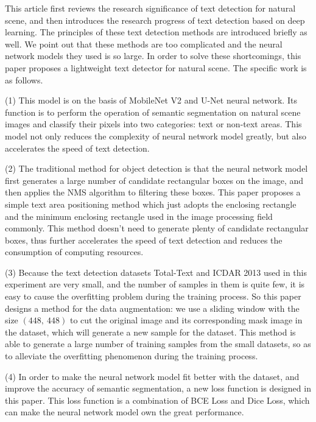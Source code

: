 \documentclass[22pt, UTF8]{article}
\numberwithin{figure}{section}
\numberwithin{table}{section}
\numberwithin{equation}{section} %
\begin{document}
\setlength\parindent{2em} This article first reviews the research significance of text detection for natural scene, and then introduces the research progress of text detection based on deep learning. The principles of these text detection methods are introduced briefly as well. We point out that these methods are too complicated and the neural network models they used is so large. In order to solve these shortcomings, this paper proposes a lightweight text detector for natural scene. The specific work is as follows.

\setlength\parindent{2em} (1) This model is on the basis of MobileNet V2 and U-Net neural network. Its function is to perform the operation of semantic segmentation on natural scene images and classify their pixels into two categories: text or non-text areas. This model not only reduces the complexity of neural network model greatly, but also accelerates the speed of text detection.

\setlength\parindent{2em} (2) The traditional method for object detection is that the neural network model first generates a large number of candidate rectangular boxes on the image, and then applies the NMS algorithm to filtering these boxes. This paper proposes a simple text area positioning method which just adopts the enclosing rectangle and the minimum enclosing rectangle used in the image processing field commonly. This method doesn't need to generate plenty of candidate rectangular boxes, thus further accelerates the speed of text detection and reduces the consumption of computing resources.

\setlength\parindent{2em} (3) Because the text detection datasets Total-Text and ICDAR 2013 used in this experiment are very small, and the number of samples in them is quite few, it is easy to cause the overfitting problem during the training process. So this paper designs a method for the data augmentation: we use a sliding window with the size $(448,\ 448)$ to cut the original image and its corresponding mask image in the dataset, which will generate a new sample for the dataset. This method is able to generate a large number of training samples from the small datasets, so as to alleviate the overfitting phenomenon during the training process.

\setlength\parindent{2em} (4) In order to make the neural network model fit better with the dataset, and improve the accuracy of semantic segmentation, a new loss function is designed in this paper. This loss function is a combination of BCE Loss and Dice Loss, which can make the neural network model own the great performance.
\end{document}

